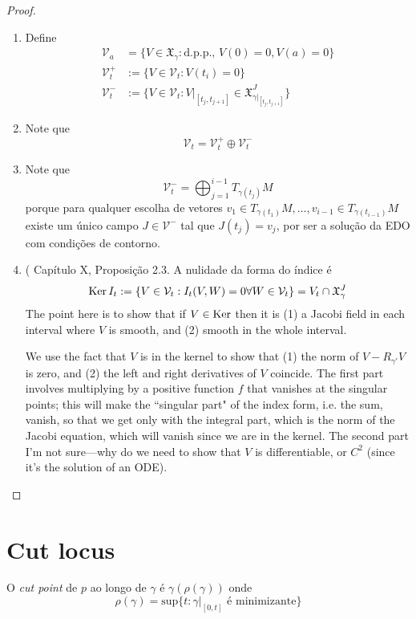 \begin{proof}
\begin{enumerate}
\item Define
\begin{align*}
\mathcal{V}_a&=\{V \in \mathfrak{X}_\gamma:\text{d.p.p., }V(0)=0, V(a)=0\}\\
\mathcal{V}_t^+&:=\{V \in \mathcal{V}_t:V(t_i)=0\}\\
\mathcal{V}_t^-& :=\{V \in \mathcal{V}_t:V|_{[t_j,t_{j+1}]}\in
\mathfrak{X}_{\gamma|_{[t_j,t_{j+1}]}}^J\}
\end{align*}
\item Note que
$$
\mathcal{V}_t=\mathcal{V}_t^+ \oplus  \mathcal{V}_t^-
$$
\item Note que 
$$
\mathcal{V}_t^-=\bigoplus_{j=1}^{i-1}T_{\gamma(t_j)}M
$$
porque para qualquer escolha de vetores
 $v_1 \in T_{\gamma(t_1)}M,\ldots,v_{i-1}\in T_{\gamma(t_{i-1})}M$ existe
 um único campo $J \in \mathcal{V}^-$ tal que $J(t_j)=v_j$, por ser a solução
 da EDO com condições de contorno.
\item (\cite{doc} Capítulo X, Proposição 2.3. A nulidade da forma do índice é
$$
\mathop{\mathrm{Ker}} I_t:=\{V \in \mathcal{V}_t:I_t(V,W)=0\forall W\in\mathcal{V}_t\}=
V_t \cap \mathfrak{X}_\gamma^J 
$$
The point here is to show that if $V \in \mathop{\mathrm{Ker}}$ then it is (1) a Jacobi
 field in each interval where $V$ is smooth, and (2) smooth in the whole
 interval.

We use the fact that $V$ is in the kernel to show that (1) the norm of 
$V-R_{\gamma'}V$ is zero, and (2) the left and right derivatives of $V$
coincide. The first part involves multiplying by a positive function $f$ that
vanishes at the singular points; this will make the ``singular part" of the
index form, i.e. the sum, vanish, so that we get only with the integral part,
which is the norm of the Jacobi equation, which will vanish since we are in the
kernel. The second part I'm not sure---why do we need to show that $V$ is
differentiable, or $C^2$ (since it's the solution of an ODE).
\end{enumerate}
\end{proof}

\section{Cut locus}
\label{section-cut-locus}

\begin{definition}
\label{definition-cut-point}
O {\it cut point} de  $p$ ao longo de $\gamma$ é $\gamma(\rho(\gamma))$ 
onde
$$
\rho(\gamma)=\text{sup}\{t:\gamma|_{[0,t]}\text{ é minimizante}\}
$$

\end{definition}


